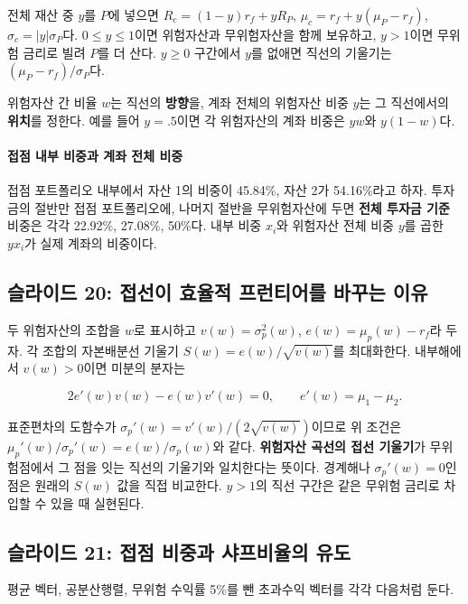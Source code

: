 \documentclass[11pt,a4paper]{article}
\begin{document}
전체 재산 중 $y$를 $P$에 넣으면 $R_c=(1-y)r_f+yR_P$, $\mu_c=r_f+y(\mu_P-r_f)$, $\sigma_c=|y|\sigma_P$다. $0\le y\le1$이면 위험자산과 무위험자산을 함께 보유하고, $y>1$이면 무위험 금리로 빌려 $P$를 더 산다. $y\ge0$ 구간에서 $y$를 없애면 직선의 기울기는 $(\mu_P-r_f)/\sigma_P$다.
\par

위험자산 간 비율 $w$는 직선의 \textbf{방향}을, 계좌 전체의 위험자산 비중 $y$는 그 직선에서의 \textbf{위치}를 정한다. 예를 들어 $y=.5$이면 각 위험자산의 계좌 비중은 $yw$와 $y(1-w)$다.
\par

\paragraph{접점 내부 비중과 계좌 전체 비중}

접점 포트폴리오 내부에서 자산 1의 비중이 45.84\%, 자산 2가 54.16\%라고 하자. 투자금의 절반만 접점 포트폴리오에, 나머지 절반을 무위험자산에 두면 \textbf{전체 투자금 기준} 비중은 각각 22.92\%, 27.08\%, 50\%다. 내부 비중 $x_i$와 위험자산 전체 비중 $y$를 곱한 $yx_i$가 실제 계좌의 비중이다.
\par

\subsection{슬라이드 20: 접선이 효율적 프런티어를 바꾸는 이유}

두 위험자산의 조합을 $w$로 표시하고 $v(w)=\sigma_p^2(w)$, $e(w)=\mu_p(w)-r_f$라 두자. 각 조합의 자본배분선 기울기 $S(w)=e(w)/\sqrt{v(w)}$를 최대화한다. 내부해에서 $v(w)>0$이면 미분의 분자는
\par

\[
2e'(w)v(w)-e(w)v'(w)=0,\qquad e'(w)=\mu_1-\mu_2.
\]

표준편차의 도함수가 $\sigma_p'(w)=v'(w)/(2\sqrt{v(w)})$이므로 위 조건은 $\mu_p'(w)/\sigma_p'(w)=e(w)/\sigma_p(w)$와 같다. \textbf{위험자산 곡선의 접선 기울기}가 무위험점에서 그 점을 잇는 직선의 기울기와 일치한다는 뜻이다. 경계해나 $\sigma_p'(w)=0$인 점은 원래의 $S(w)$ 값을 직접 비교한다. $y>1$의 직선 구간은 같은 무위험 금리로 차입할 수 있을 때 실현된다.
\par

\subsection{슬라이드 21: 접점 비중과 샤프비율의 유도}

평균 벡터, 공분산행렬, 무위험 수익률 5\%를 뺀 초과수익 벡터를 각각 다음처럼 둔다.
\par
\end{document}
